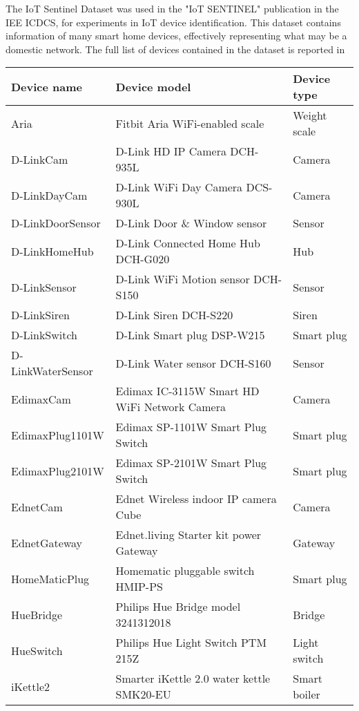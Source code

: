 The {IoT Sentinel Dataset} was used in the "IoT SENTINEL" publication in the IEE ICDCS, for experiments in IoT device identification. This dataset contains information of many smart home devices, effectively representing what may be a domestic network. The full list of devices contained in the dataset is reported in 


\begin{table}[H]
    \centering
    \begin{tabular}{l|l|l}
    \toprule
     Device name & Device model & Device type  \\
    \midrule
  Aria              & Fitbit Aria WiFi-enabled scale  &  Weight scale \\
  D-LinkCam         & D-Link HD IP Camera DCH-935L    &  Camera \\
  D-LinkDayCam      & D-Link WiFi Day Camera DCS-930L &  Camera \\
  D-LinkDoorSensor  & D-Link Door \& Window sensor     &  Sensor\\
  D-LinkHomeHub     &  D-Link Connected Home Hub DCH-G020 &  Hub  \\
  D-LinkSensor      & D-Link WiFi Motion sensor DCH-S150 &  Sensor \\
  D-LinkSiren       & D-Link Siren DCH-S220&  Siren \\
  D-LinkSwitch      & D-Link Smart plug DSP-W215  &  Smart plug \\
  D-LinkWaterSensor & D-Link Water sensor DCH-S160 &  Sensor \\
  EdimaxCam         & Edimax IC-3115W Smart HD WiFi Network Camera &  Camera \\
  EdimaxPlug1101W   & Edimax SP-1101W Smart Plug Switch  &  Smart plug \\
  EdimaxPlug2101W   & Edimax SP-2101W Smart Plug Switch&  Smart plug \\
  EdnetCam          & Ednet Wireless indoor IP camera Cube  &  Camera\\
  EdnetGateway      & Ednet.living Starter kit power Gateway & Gateway \\
  HomeMaticPlug     & Homematic pluggable switch HMIP-PS & Smart plug \\
  HueBridge         & Philips Hue Bridge model 3241312018 &  Bridge\\
  HueSwitch         & Philips Hue Light Switch PTM 215Z &  Light switch \\
  iKettle2          &  Smarter iKettle 2.0 water kettle SMK20-EU & Smart boiler \\

\end{tabular}
\end{table}
